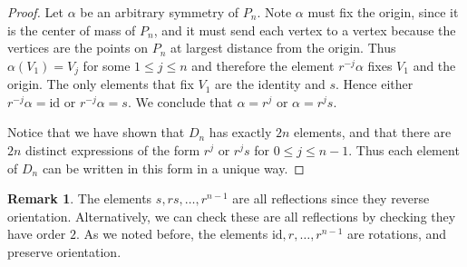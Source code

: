 \documentclass[12pt]{report}
\numberwithin{equation}{section}
\numberwithin{theorem}{chapter}
\theoremstyle{definition}
\newtheorem*{basic properties}{Basic Properties}
\newtheorem*{Important Remark}{Important Remark}
\newtheorem{remark}[theorem]{Remark}
\begin{document}
\begin{proof}
Let $\alpha$ be an arbitrary symmetry of $P_n$. Note $\alpha$ must fix the origin, since it is the center of mass of $P_n$, and it must send each vertex to a vertex because the vertices are the points on $P_n$ at largest distance from the origin.
Thus $\alpha(V_1) = V_ j$ for some $1 \leqslant j \leqslant n$ and therefore the element $r^{-j}\alpha$ fixes $V_1$ and the origin. The only elements that fix $V_1$ are the identity and $s$. Hence either $r^{-j}\alpha = \mathrm{id}$ or $r^{-j}\alpha = s$. We conclude that $\alpha = r^j$ or $\alpha = r^js$.

Notice that we have shown that $D_n$ has exactly $2n$ elements, and that there are $2n$ distinct expressions of the form $r^j$ or $r^js$ for $0 \leqslant j \leqslant n-1$. Thus each element of $D_n$ can be written in this form in a unique way.
\end{proof}



\begin{remark}
The elements $s, rs, \dots, r^{n-1}$ are all reflections since they reverse
  orientation. Alternatively, we can check these are all reflections by checking they have order $2$. As we noted before, the elements $\mathrm{id}, r, \dots, r^{n-1}$ are rotations, and preserve orientation.
\end{remark}
\end{document}
